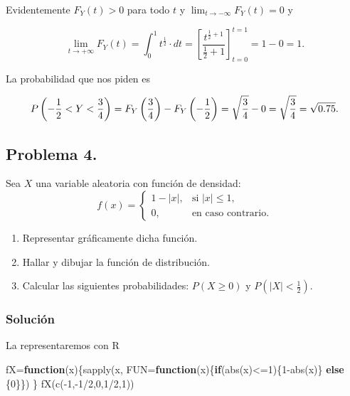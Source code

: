 \documentclass[
]{article}
\newenvironment{Shaded}{\begin{snugshade}}{\end{snugshade}}
\newcommand{\AttributeTok}[1]{\textcolor[rgb]{0.77,0.63,0.00}{#1}}
\newcommand{\ControlFlowTok}[1]{\textcolor[rgb]{0.13,0.29,0.53}{\textbf{#1}}}
\newcommand{\DecValTok}[1]{\textcolor[rgb]{0.00,0.00,0.81}{#1}}
\newcommand{\FunctionTok}[1]{\textcolor[rgb]{0.00,0.00,0.00}{#1}}
\newcommand{\NormalTok}[1]{#1}
\newcommand{\OtherTok}[1]{\textcolor[rgb]{0.56,0.35,0.01}{#1}}
\newcommand{\SpecialCharTok}[1]{\textcolor[rgb]{0.00,0.00,0.00}{#1}}
\providecommand{\tightlist}{%
  \setlength{\itemsep}{0pt}\setlength{\parskip}{0pt}}
\begin{document}
Evidentemente \(F_Y(t)>0\) para todo \(t\) y
\(\lim_{t\to-\infty} F_Y(t)=0\) y

\[
\lim_{t\to+\infty} F_Y(t)=\int_0^1 t^{\frac12} \cdot dt =
\left[\frac{t^{\frac12+1}}{\frac12+1}\right]_{t=0}^{t=1}=1-0=1.
\]

La probabilidad que nos piden es

\[
P\left(-{1\over 2}<Y<{3\over 4}\right)=F_Y\left({3\over 4}\right)-F_Y\left(-{1\over 2}\right)=\sqrt{\frac34}-0=\sqrt{\frac34}=\sqrt{0.75}.
\]

\hypertarget{problema-4.}{%
\subsection{Problema 4.}\label{problema-4.}}

Sea \(X\) una variable aleatoria con función de densidad: \[
f(x)=\begin{cases}
1-|x|, & \mbox{si }|x|\leq 1,\\
0, & \mbox{en caso contrario.}
\end{cases}
\]

\begin{enumerate}
\def\labelenumi{\arabic{enumi}.}
\tightlist
\item
  Representar gráficamente dicha función.
\item
  Hallar y dibujar la función de distribución.
\item
  Calcular las siguientes probabilidades: \(P(X\geq 0)\) y
  \(P\left(|X|<\frac{1}{2}\right).\)
\end{enumerate}

\hypertarget{soluciuxf3n-3}{%
\subsubsection{Solución}\label{soluciuxf3n-3}}

La representaremos con R

\begin{Shaded}
\begin{Highlighting}[]
\NormalTok{fX}\OtherTok{=}\ControlFlowTok{function}\NormalTok{(x)\{}\FunctionTok{sapply}\NormalTok{(x,}
                      \AttributeTok{FUN=}\ControlFlowTok{function}\NormalTok{(x)\{}\ControlFlowTok{if}\NormalTok{(}\FunctionTok{abs}\NormalTok{(x)}\SpecialCharTok{\textless{}=}\DecValTok{1}\NormalTok{)\{}\DecValTok{1}\SpecialCharTok{{-}}\FunctionTok{abs}\NormalTok{(x)\}}
                        \ControlFlowTok{else}\NormalTok{ \{}\DecValTok{0}\NormalTok{\}\})}
\NormalTok{  \}}
\FunctionTok{fX}\NormalTok{(}\FunctionTok{c}\NormalTok{(}\SpecialCharTok{{-}}\DecValTok{1}\NormalTok{,}\SpecialCharTok{{-}}\DecValTok{1}\SpecialCharTok{/}\DecValTok{2}\NormalTok{,}\DecValTok{0}\NormalTok{,}\DecValTok{1}\SpecialCharTok{/}\DecValTok{2}\NormalTok{,}\DecValTok{1}\NormalTok{))}
\end{Highlighting}
\end{Shaded}
\end{document}

